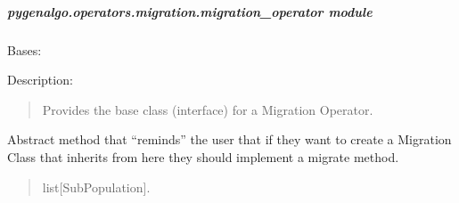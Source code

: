 \documentclass[letterpaper,10pt,english]{sphinxmanual}
\begin{document}
\subparagraph{pygenalgo.operators.migration.migration\_operator module}
\label{\detokenize{pygenalgo.operators.migration:module-pygenalgo.operators.migration.migration_operator}}\label{\detokenize{pygenalgo.operators.migration:pygenalgo-operators-migration-migration-operator-module}}

\begin{fulllineitems}
\label{\detokenize{pygenalgo.operators.migration:pygenalgo.operators.migration.migration_operator.MigrationOperator}}
\pysigstartsignatures
\pysiglinewithargsret
{}
{}
{}
\pysigstopsignatures
\sphinxAtStartPar
Bases: {\hyperref[\detokenize{pygenalgo.operators:pygenalgo.operators.genetic_operator.GeneticOperator}]{}}

\sphinxAtStartPar
Description:
\begin{quote}

\sphinxAtStartPar
Provides the base class (interface) for a Migration Operator.
\end{quote}

\begin{fulllineitems}
\label{\detokenize{pygenalgo.operators.migration:pygenalgo.operators.migration.migration_operator.MigrationOperator.migrate}}
\pysigstartsignatures
\pysiglinewithargsret
{}
{}
{}
\pysigstopsignatures
\sphinxAtStartPar
Abstract method that “reminds” the user that if they want to
create a Migration Class that inherits from here they should
implement a migrate method.
\begin{quote}\begin{description}
\sphinxAtStartPar
{} \textendash{} list{[}SubPopulation{]}.


\end{description}
\end{quote}
\end{fulllineitems}
\end{fulllineitems}
\end{document}
